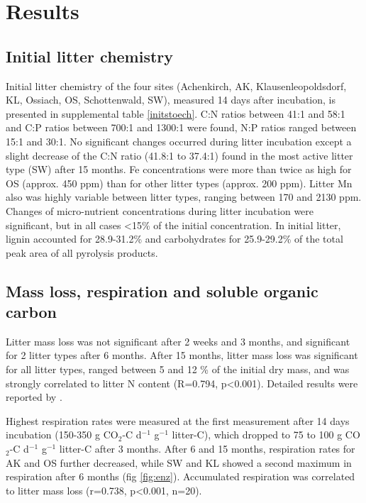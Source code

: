 \section*{Results}
\subsection*{Initial litter chemistry}
Initial litter chemistry of the four sites (Achenkirch, AK, Klausenleopoldsdorf, KL, Ossiach, OS, Schottenwald, SW), measured 14 days after incubation, is presented in supplemental table \ref{initstoech}. C:N ratios between 41:1 and 58:1 and C:P ratios between 700:1 and 1300:1 were found, N:P ratios ranged between 15:1 and 30:1. No significant changes occurred during litter incubation except a slight decrease of the C:N ratio (41.8:1 to 37.4:1) found in the most active litter type (SW) after 15 months. Fe concentrations were more than twice as high for OS (approx. 450 ppm) than for other litter types (approx. 200 ppm). Litter Mn also was highly variable between litter types, ranging between 170 and 2130 ppm. Changes of micro-nutrient concentrations during litter incubation were significant, but in all cases \textless 15\% of the initial concentration. In initial litter, lignin accounted for 28.9-31.2\% and carbohydrates for 25.9-29.2\% of the total peak area of all pyrolysis products.

\subsection*{Mass loss, respiration and soluble organic carbon}

Litter mass loss was not significant after 2 weeks and 3 months, and significant for 2 litter types after 6 months. After 15 months, litter mass loss was significant for all litter types, ranged between 5 and 12 \% of the initial dry mass, and was strongly correlated to litter N content (R=0.794, p\textless 0.001). Detailed results were reported by \cite{Mooshammer2011}.

Highest respiration rates were measured at the first measurement after 14 days incubation (150-350 \textmu g CO$_2$-C d$^{-1}$ g$^{-1}$ litter-C), which dropped to 75 to 100 \textmu g CO$_2$-C d$^{-1}$ g$^{-1}$ litter-C after 3 months. After 6 and 15 months, respiration rates for AK and OS further decreased, while SW and KL showed a second maximum in respiration after 6 months (fig \ref{fig:enz}). Accumulated respiration was correlated to litter mass loss (r=0.738, p\textless 0.001, n=20).

